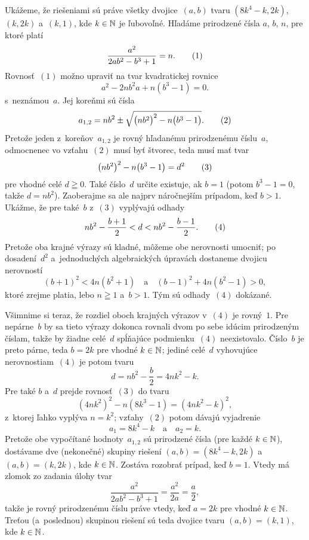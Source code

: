 {%
Ukážeme, že riešeniami sú práve všetky dvojice~$(a,b)$ tvaru
$(8k^4-k,2k)$, $(k,2k)$ a~$(k,1)$, kde $k\in\Bbb N$ je ľubovoľné.
Hľadáme prirodzené čísla $a$, $b$, $n$, pre ktoré platí
$$
\frac{a^2}{2ab^2-b^3+1}=n.
\tag1
$$
Rovnosť~$(1)$ možno upraviť na tvar kvadratickej rovnice
$$
a^2-2nb^{2}a+n(b^3-1)=0.
$$
s~neznámou~$a$. Jej koreňmi sú čísla
$$
a_{1,2}=nb^2\pm\sqrt{\big(nb^2\big)^2-n\big(b^3-1\big)}.
\tag2
$$
Pretože jeden z~koreňov~$a_{1,2}$ je rovný hľadanému
prirodzenému číslu~$a$, odmocnenec vo vzťahu~$(2)$ musí byť
štvorec, teda musí mať tvar
$$
\big(nb^2\big)^2-n\big(b^3-1\big)=d^2        \tag3
$$
pre vhodné celé $d\geqq0$. Také číslo~$d$ určite existuje,
ak $b=1$ (potom $b^3-1=0$, takže $d=nb^2$). Zaoberajme sa ale
najprv náročnejším prípadom, keď $b>1$. Ukážme, že pre
také~$b$ z~$(3)$ vyplývajú odhady
$$
nb^2-\frac{b+1}{2}<d<nb^2-\frac{b-1}{2}.     \tag4
$$
Pretože oba krajné výrazy sú kladné, môžeme obe nerovnosti
umocniť; po dosadení~$d^2$ a~jednoduchých algebraických úpravách
dostaneme dvojicu nerovností
$$
(b+1)^2<4n(b^2+1)\quad\text{a}\quad
(b-1)^2+4n(b^2-1)>0,
$$
ktoré zrejme platia, lebo $n\geqq1$ a~$b>1$. Tým sú odhady~$(4)$
dokázané.

Všimnime si teraz, že rozdiel oboch krajných výrazov v~$(4)$ je rovný~$1$.
Pre nepárne~$b$ by sa tieto výrazy dokonca rovnali dvom
po sebe idúcim prirodzeným číslam, takže by žiadne celé~$d$
spĺňajúce podmienku~$(4)$ neexistovalo. Číslo~$b$ je preto párne,
teda $b=2k$ pre vhodné $k\in\Bbb N$; jediné celé~$d$ vyhovujúce
nerovnostiam~$(4)$ je potom tvaru
$$
d=nb^2-\frac{b}{2}=4nk^2-k.
$$
Pre také $b$ a~$d$ prejde rovnosť~$(3)$ do tvaru
$$
(4nk^2)^2-n(8k^3-1)=(4nk^2-k)^2,
$$
z~ktorej ľahko vyplýva $n=k^2$; vzťahy~$(2)$ potom dávajú vyjadrenie
$$
a_1=8k^4-k\quad\text{a}\quad
a_2=k.
$$
Pretože obe vypočítané hodnoty~$a_{1,2}$ sú prirodzené čísla
(pre každé $k\in\Bbb N$), dostávame dve (nekonečné) skupiny riešení
$(a,b)=(8k^4-k,2k)$ a~$(a,b)=(k,2k)$, kde $k\in\Bbb N$.
Zostáva rozobrať prípad, keď $b=1$. Vtedy má zlomok zo zadania úlohy
tvar
$$
\frac{a^2}{2ab^2-b^3+1}=\frac{a^2}{2a}=\frac{a}{2},
$$
takže je rovný prirodzenému číslu práve vtedy, keď $a=2k$ pre vhodné
$k\in\Bbb N$. Treťou (a~poslednou) skupinou riešení sú teda
dvojice tvaru $(a,b)=(k,1)$, kde $k\in\Bbb N$.}

